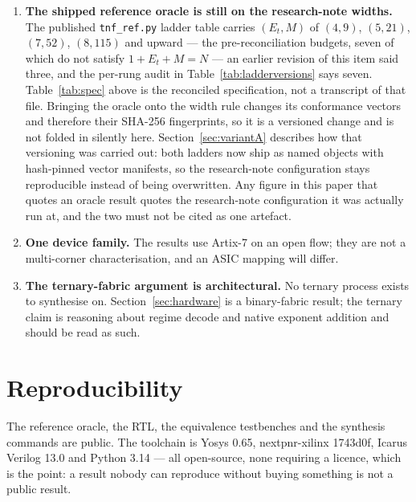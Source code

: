 \begin{enumerate}[leftmargin=*]
\item \textbf{The shipped reference oracle is still on the research-note widths.}
The published \texttt{tnf\_ref.py} ladder table carries $(E_t,M)$ of
$(4,9)$, $(5,21)$, $(7,52)$, $(8,115)$ and upward --- the pre-reconciliation
budgets, seven of which do not satisfy $1+E_t+M=N$ --- an earlier revision of this
item said three, and the per-rung audit in Table~\ref{tab:ladderversions} says
seven. Table~\ref{tab:spec} above is
the reconciled specification, not a transcript of that file. Bringing the oracle
onto the width rule changes its conformance vectors and therefore their SHA-256
fingerprints, so it is a versioned change and is not folded in silently here.
Section~\ref{sec:variantA} describes how that versioning was carried out: both
ladders now ship as named objects with hash-pinned vector manifests, so the
research-note configuration stays reproducible instead of being overwritten. Any
figure in this paper that quotes an oracle result quotes the research-note
configuration it was actually run at, and the two must not be cited as one
artefact.

\item \textbf{One device family.} The results use Artix-7 on an open flow; they
are not a multi-corner characterisation, and an ASIC mapping will differ.

\item \textbf{The ternary-fabric argument is architectural.} No ternary process
exists to synthesise on. Section~\ref{sec:hardware} is a binary-fabric result;
the ternary claim is reasoning about regime decode and native exponent addition
and should be read as such.
\end{enumerate}


\section*{Reproducibility}

The reference oracle, the RTL, the equivalence testbenches and the synthesis
commands are public. The toolchain is Yosys 0.65, nextpnr-xilinx 1743d0f,
Icarus Verilog 13.0 and Python 3.14 --- all open-source, none requiring a
licence, which is the point: a result nobody can reproduce without buying
something is not a public result.


